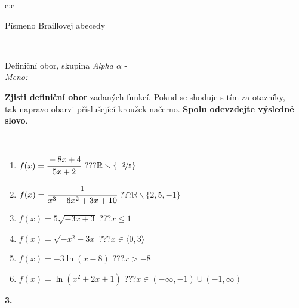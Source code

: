 \documentclass[10pt]{report}
\begin{document}
\begin{tabular}{c:c}
\begin{minipage}[c][104.5mm][t]{0.5\linewidth}
\begin{center}
\begin{minipage}{0.20\linewidth}
\begin{center}
{\small Písmeno Braillovej abecedy}
\end{center}
\end{minipage}
\end{center}
\end{minipage}
\\ \hdashline
\begin{minipage}[c][104.5mm][t]{0.5\linewidth}
\begin{center}
\vspace{7mm}
{\huge Definiční obor, skupina \textit{Alpha $\alpha$} -}\\[5mm]
\textit{Meno:}\phantom{xxxxxxxxxxxxxxxxxxxxxxxxxxxxxxxxxxxxxxxxxxxxxxxxxxxxxxxxxxxxxxxxx}\\[5mm]
\begin{minipage}{0.95\linewidth}
\textbf{Zjisti definiční obor} zadaných funkcí. Pokud se shoduje s tím za otazníky,\\tak napravo obarvi příslušející kroužek načerno. \textbf{Spolu odevzdejte výsledné slovo}.
\end{minipage}
\\[1mm]
\begin{minipage}{0.79\linewidth}
\begin{center}
\begin{varwidth}{\linewidth}
\begin{enumerate}
\normalsizerrr
\item $f(x)=\cfrac{-8x+4}{5x+2}$\quad \dotfill\; ???\;\dotfill \quad $\mathbb{R}\smallsetminus\{\nicefrac{-2}{5}\}$
\item $f(x)=\cfrac{1}{x^3-6x^2+3x+10}$\quad \dotfill\; ???\;\dotfill \quad $\mathbb{R}\smallsetminus\{2,5,-1\}$
\item $f(x)=5\sqrt{-3x+3}$\quad \dotfill\; ???\;\dotfill \quad $x\leq1$
\item $f(x)=\sqrt{-x^2-3x}$\quad \dotfill\; ???\;\dotfill \quad $x\in\langle0 , 3\rangle$
\item $f(x)=-3\ln{(x-8)}$\quad \dotfill\; ???\;\dotfill \quad $x>-8$
\item $f(x)=\ln{(x^2+2x+1)}$\quad \dotfill\; ???\;\dotfill \quad $x\in(-\infty , -1)\cup(-1 , \infty)$
\end{enumerate}
\end{varwidth}
\end{center}
\end{minipage}
\begin{minipage}{0.20\linewidth}
\begin{center}
{\Huge\bfseries 3.} \\[2mm]

\end{center}
\end{minipage}
\end{center}
\end{minipage}
\end{tabular}
\end{document}
